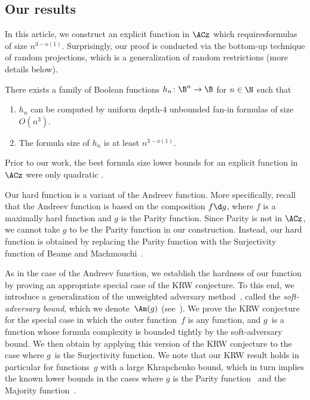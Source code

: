 \subsection{Our results}

In this %
article,  %
we construct an explicit function in $\ACz$ which requiresformulas of size $n^{3-o(1)}$. Surprisingly, our proof
is conducted via the bottom-up technique of random projections, which
is a generalization of random restrictions (more details below).
\begin{theorem}
\label{thm:main}There exists a family of Boolean functions $h_{n}\colon\B^{n}\to\B$
for $n\in\N$ such that 
\begin{enumerate}
\item $h_{n}$ can be computed by uniform depth-$4$ unbounded fan-in formulas
of size $O(n^{3})$. 
\item The formula size of $h_{n}$ is at least $n^{3-o(1)}$.
\end{enumerate}
\end{theorem}

Prior to our work, the best formula size lower bounds
%
for  %
an explicit
function in $\ACz$ were only quadratic \cite{N66,CKK12,JuknaBook,BM12}.

Our hard function is a variant of the Andreev function. More specifically,
recall that the Andreev function is based on the composition $f\d g$,
where $f$ is a maximally hard function and $g$ is the Parity function.
Since Parity is not in $\ACz$, we cannot take $g$ to be the Parity
function in our construction. Instead, our hard function is obtained
by replacing the Parity function with the Surjectivity function of Beame and Machmouchi~\cite{BM12}.

As in the case of the Andreev function, we establish the hardness
of our function by proving an appropriate special case of the KRW
conjecture. To this end, we introduce a generalization of the unweighted
%
adversary method~\cite{A02}, called the \emph{soft-adversary bound}, which we
denote~$\Am(g)$ (see~). We prove the KRW
conjecture for the special case in which the outer function~$f$
is any function, and $g$~is a function whose formula complexity
is bounded tightly by the soft-adversary bound. We then obtain 
by applying this version of the KRW conjecture to the case where $g$~is
the Surjectivity function. We note that our KRW result holds in particular
for functions~$g$ with a large Khrapchenko bound, which in turn
implies the known lower bounds in the cases where $g$ is the Parity
function~\cite{H98} and the Majority function~\cite{GTN19}.

